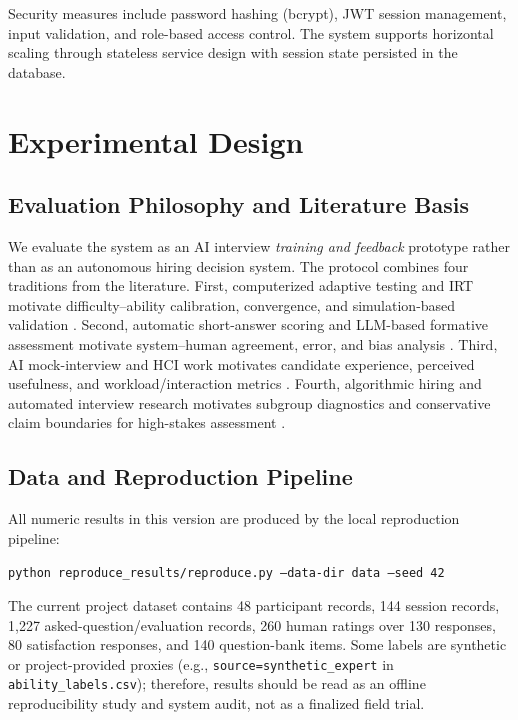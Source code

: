 ﻿\documentclass[final,3p,times,authoryear]{elsarticle}
\begin{document}
Security measures include password hashing (bcrypt), JWT session management, input validation, and role-based access control. The system supports horizontal scaling through stateless service design with session state persisted in the database.

\section{Experimental Design}
\label{sec:experiments}

\subsection{Evaluation Philosophy and Literature Basis}

\noindent We evaluate the system as an AI interview \emph{training and feedback} prototype rather than as an autonomous hiring decision system. The protocol combines four traditions from the literature. First, computerized adaptive testing and IRT motivate difficulty--ability calibration, convergence, and simulation-based validation \cite{van2006computerized,hambleton1991fundamentals,zhuang2024catsurvey,roarcat2025}. Second, automatic short-answer scoring and LLM-based formative assessment motivate system--human agreement, error, and bias analysis \cite{burrows2015eraser,mohler2011evaluation,llm_formative2025}. Third, AI mock-interview and HCI work motivates candidate experience, perceived usefulness, and workload/interaction metrics \cite{conversate2024,virtual_interviewers2025}. Fourth, algorithmic hiring and automated interview research motivates subgroup diagnostics and conservative claim boundaries for high-stakes assessment \cite{kumar2022fairness,kim2024interview}.

\subsection{Data and Reproduction Pipeline}

\noindent All numeric results in this version are produced by the local reproduction pipeline:
\begin{center}
\texttt{python reproduce\_results/reproduce.py --data-dir data --seed 42}
\end{center}
The current project dataset contains 48 participant records, 144 session records, 1,227 asked-question/evaluation records, 260 human ratings over 130 responses, 80 satisfaction responses, and 140 question-bank items. Some labels are synthetic or project-provided proxies (e.g., \texttt{source=synthetic\_expert} in \texttt{ability\_labels.csv}); therefore, results should be read as an offline reproducibility study and system audit, not as a finalized field trial.
\end{document}
